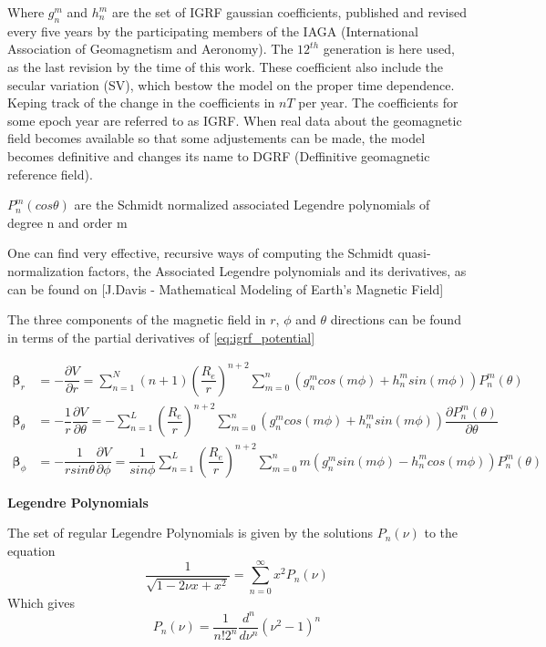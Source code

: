 Where $g_n^m$ and $h_n^m$ are the set of IGRF gaussian coefficients, published and revised every five years by the participating members of the IAGA (International Association
of Geomagnetism and Aeronomy). The $12^{th}$ generation is here used, as the last revision by the time of this work. These coefficient also include the secular variation (SV), which bestow the model on the proper time dependence. Keping track of the change in the coefficients in $nT$ per year. The coefficients  for some epoch year are referred to as IGRF. When real data about the geomagnetic field becomes available so that some adjustements can be made, the model becomes definitive and changes its name to DGRF (Deffinitive geomagnetic reference field).

$P_n^m(cos \theta)$ are the Schmidt normalized associated Legendre polynomials of degree n and order m

One can find very effective, recursive ways of computing the Schmidt quasi-normalization factors, the Associated Legendre polynomials and its derivatives, as can be found on [J.Davis - Mathematical Modeling of Earth’s Magnetic Field] %

The three components of the magnetic field in $r$, $\phi$ and $\theta$ directions can be found in terms of the partial derivatives of \ref{eq:igrf_potential}


\begin{equation} \label{eq:local_sph_cpmt}
\begin{aligned}
{\bm \beta}_r &= -\dfrac{\partial V}{\partial r} = \sum_{n=1}^{N} (n+1) \left(\dfrac{R_e}{r}\right)^{n+2} \sum_{m=0}^{n} \left(g_n^m cos(m\phi) + h_n^m sin(m\phi)\right) P_n^m(\theta)\\
{\bm \beta}_{\theta} &= -\dfrac{1}{r} \dfrac{\partial V}{\partial \theta} = 
-\sum_{n=1}^{L} \left(\dfrac{R_e}{r}\right)^{n+2} \sum_{m=0}^{n} \left(g_n^m cos(m\phi) + h_n^m sin(m\phi)\right) \dfrac{\partial P_n^m(\theta)}{\partial \theta}\\
{\bm \beta}_{\phi} &= -\dfrac{1}{r sin\theta} \dfrac{\partial V}{\partial \phi} = 
\dfrac{1}{sin\phi}\sum_{n=1}^{L} \left(\dfrac{R_e}{r}\right)^{n+2} \sum_{m=0}^{n} m\left(g_n^m sin(m\phi) - h_n^m cos(m\phi)\right) P_n^m(\theta)
\end{aligned}
\end{equation}


{\bf Legendre Polynomials}

The set of regular Legendre Polynomials is given by the solutions $P_n(\nu)$ to the equation
\begin{equation}
\dfrac{1}{\sqrt{1-2\nu x + x^2}} = \sum_{n=0}^\infty x^2 P_n(\nu)
\end{equation}
Which gives
\begin{equation}
P_n(\nu) = \dfrac{1}{n! 2^n} \dfrac{d^n}{d\nu^n} (\nu^2 -1)^n
\end{equation}

